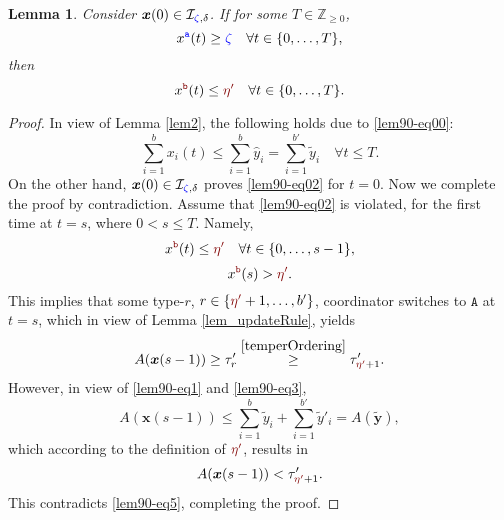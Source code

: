 \documentclass[10 pt,twocolumn,journal]{IEEEtran}
\theoremstyle{plain}
\newtheorem{lemma}{Lemma}
\newcommand{\A}{\mathcal{A}}
\newcommand{\I}{\mathcal{I}}
\newcommand{\x}{\bm{x}}
\newcommand{\y}{\bm{y}}
\renewcommand{\r}{\tb{\zeta}}
\renewcommand{\ss}{\tr{\eta'}}
\renewcommand{\d}{{\delta}}
\newcommand{\n}{\tb{\mathtt{a}}}
\renewcommand{\o}{\tr{\mathtt{b}}}
\renewcommand{\A}{\mathtt{A}}
\newcommand{\tb}{\textcolor{blue}}
\newcommand{\tr}{\textcolor{Myred}}
\theoremstyle{definition}
\begin{document}
%
\begin{lemma} \label{lem90} 
    Consider $\x(0) \in \I_{\r,\d}$.
    If for some $T\in\mathbb{Z}_{\geq0}$,  
    \begin{equation}   \label{lem90-eq00}
        x^{\n}(t) \geq \r \quad \forall t\in\{0,\ldots, T\},
    \end{equation}
    then 
    \begin{equation} \label{lem90-eq02}
         x^{\o}(t) \leq \ss \quad \forall t\in\{0,\ldots, T\}.
    \end{equation}
\end{lemma}
\begin{proof}
    In view of Lemma \ref{lem2}, the following holds due to \eqref{lem90-eq00}:
    \begin{equation} \label{lem90-eq1}
         \sum_{i=1}^b x_i(t) \leq \sum_{i=1}^b\hat{y}_i
         = \sum_{i=1}^{b'}\tilde{y}_i\quad \forall t\leq T.
    \end{equation}
    On the other hand, $\x(0)\in\I_{\r,\d}$ proves \eqref{lem90-eq02} for $t=0$.
    Now we complete the proof by contradiction.
    Assume that \eqref{lem90-eq02} is violated, for the first time at $t=s$, where $0<s\leq T$.
    Namely,
    \begin{equation} \label{lem90-eq3}
         x^{\o}(t) \leq \ss \quad \forall t\in\{0,\ldots, s-1\},
    \end{equation}
    \begin{equation*} %
         x^{\o}(s) > \ss.
    \end{equation*}
    This implies that some type-$r$, $r\in\{\ss+1,\ldots, b'\}$, coordinator switches to $\A$ at $t=s$, which in view of Lemma \ref{lem_updateRule}, yields 
    \begin{equation} \label{lem90-eq5}
         A(\x(s-1)) \geq \tau'_r \overset{\eqref{temperOrdering}}{\geq} \tau'_{\ss+1}.
    \end{equation}    
    However, in view of \eqref{lem90-eq1} and \eqref{lem90-eq3},
    \begin{equation*} %
         A(\x(s-1)) \leq \sum_{i=1}^{b}\tilde{y}_i +  \sum_{i=1}^{b'}\tilde{y}'_i 
         = A(\tilde{\y}),
    \end{equation*}
    which according to the definition of $\ss$, results in 
    \begin{equation*} %
         A(\x(s-1)) < \tau'_{\ss+1}.
    \end{equation*}
    This contradicts \eqref{lem90-eq5}, completing the proof.
\end{proof}
\end{document}
